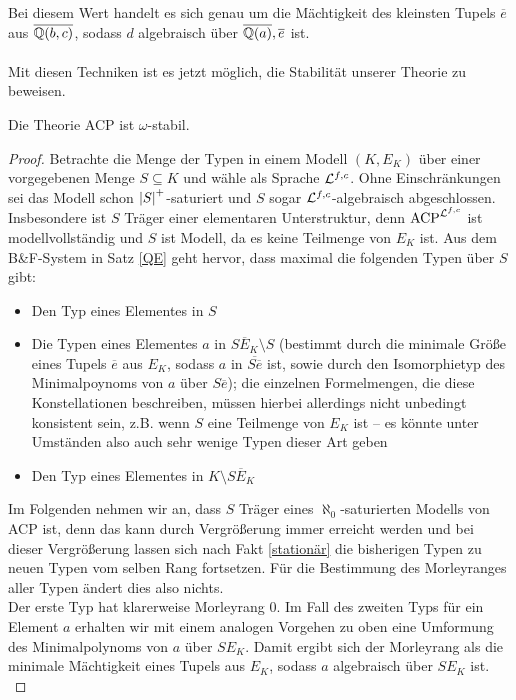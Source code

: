     Bei diesem Wert handelt es sich genau um die Mächtigkeit des kleinsten Tupels $\overline{e}$ aus $\overline{\mathbb{Q}(b,c)}$, sodass $d$ algebraisch über $\overline{\mathbb{Q}(a)},\overline{e}$ ist.\\\\
    Mit diesen Techniken ist es jetzt möglich, die Stabilität unserer Theorie zu beweisen.
    \newpage
    \begin{theorem}
    	Die Theorie ACP ist $\omega$-stabil.
    \end{theorem}
    \begin{proof}
    	Betrachte die Menge der Typen in einem Modell $(K,E_K)$ über einer vorgegebenen Menge $S\subseteq K$ und wähle als Sprache $\mathcal{L}^{f,c}$. Ohne Einschränkungen sei das Modell schon ${\left| S \right|}^+$-saturiert und $S$ sogar $\mathcal{L}^{f,c}$-algebraisch abgeschlossen. Insbesondere ist $S$ Träger einer elementaren Unterstruktur, denn $\operatorname{ACP}^{\mathcal{L}^{f,c}}$ ist modellvollständig und $S$ ist Modell, da es keine Teilmenge von $E_K$ ist. Aus dem B\&F-System in Satz \ref{QE} geht hervor, dass maximal die folgenden Typen über $S$ gibt:
    	\begin{itemize}
    		\item Den Typ eines Elementes in $S$
    		\item Die Typen eines Elementes $a$ in $\overline{SE_K}\setminus S$ (bestimmt durch die minimale Größe eines Tupels $\overline{e}$ aus $E_K$, sodass $a$ in $\overline{S\overline{e}}$ ist, sowie durch den Isomorphietyp des Minimalpoynoms von $a$ über $S\overline{e}$); die einzelnen Formelmengen, die diese Konstellationen beschreiben, müssen hierbei allerdings nicht unbedingt konsistent sein, z.B. wenn $S$ eine Teilmenge von $E_K$ ist \--- es könnte unter Umständen also auch sehr wenige Typen dieser Art geben
    		\item Den Typ eines Elementes in $K\setminus\overline{SE_K}$
    	\end{itemize}
        Im Folgenden nehmen wir an, dass $S$ Träger eines $\aleph_0$-saturierten Modells von ACP ist, denn das kann durch Vergrößerung immer erreicht werden und bei dieser Vergrößerung lassen sich nach Fakt \ref{stationär} die bisherigen Typen zu neuen Typen vom selben Rang fortsetzen. Für die Bestimmung des Morleyranges aller Typen ändert dies also nichts.\\
        Der erste Typ hat klarerweise Morleyrang 0. Im Fall des zweiten Typs für ein Element $a$ erhalten wir mit einem analogen Vorgehen zu oben eine Umformung des Minimalpolynoms von $a$ über $SE_K$. Damit ergibt sich der Morleyrang als die minimale Mächtigkeit eines Tupels aus $E_K$, sodass $a$ algebraisch über $SE_K$ ist.\\

\end{proof}
